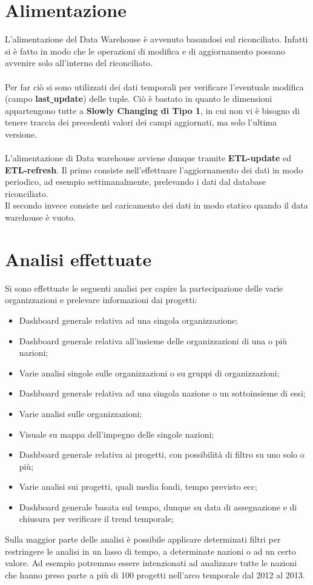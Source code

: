 \documentclass[12pt,a4paper]{report}
\begin{document}
\section*{Alimentazione}
L'alimentazione del Data Warehouse è avvenuto basandosi sul riconciliato. Infatti si è fatto in modo che le operazioni di modifica e di aggiornamento possano avvenire solo all'interno del riconciliato.
\\\\
\noindent Per far ciò si sono utilizzati dei dati temporali per verificare l'eventuale modifica (campo \textbf{last\underline{ }update}) delle tuple. Ciò è bastato in quanto le dimensioni appartengono tutte a \textbf{Slowly Changing di Tipo 1}, in cui non vi è bisogno di tenere traccia dei precedenti valori dei campi aggiornati, ma solo l'ultima versione.
\\\\\noindent
L'alimentazione di Data warehouse avviene dunque tramite \textbf{ETL-update} ed \textbf{ETL-refresh}. Il primo consiste nell'effettuare l'aggiornamento dei dati in modo periodico, ad esempio settimanalmente, prelevando i dati dal database riconciliato.\\
Il secondo invece consiste nel caricamento dei dati in modo statico quando il data warehouse è vuoto.\newpage
\section*{Analisi effettuate}
Si sono effettuate le seguenti analisi per capire la partecipazione delle varie organizzazioni e prelevare informazioni dai progetti:
\begin{itemize}
	\item Dashboard generale relativa ad una singola organizzazione;
	\item Dashboard generale relativa all'insieme delle organizzazioni di una o più nazioni;
	\item Varie analisi singole sulle organizzazioni o su gruppi di organizzazioni;
	\item Dashboard generale relativa ad una singola nazione o un sottoinsieme di essi;
	\item Varie analisi sulle organizzazioni;
	\item Visuale su mappa dell'impegno delle singole nazioni;
	\item Dashboard generale relativa ai progetti, con possibilità di filtro su uno solo o più;
	\item Varie analisi sui progetti, quali media fondi, tempo previsto ecc;
	\item Dashboard generale basata sul tempo, dunque su data di assegnazione e di chiusura per verificare il trend temporale;
\end{itemize}
Sulla maggior parte delle analisi è possibile applicare determinati filtri per restringere le analisi in un lasso di tempo, a determinate nazioni o ad un certo valore. Ad esempio potremmo essere intenzionati ad analizzare tutte le nazioni che hanno preso parte a più di 100 progetti nell'arco temporale dal 2012 al 2013.
\end{document}
